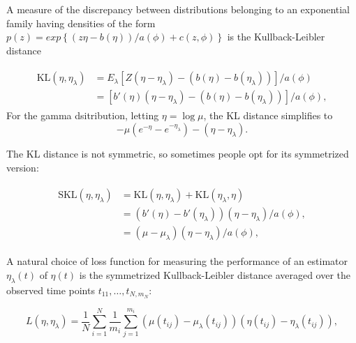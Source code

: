 \bigskip

A measure of the discrepancy between distributions belonging to an exponential family having densities of the form $p\left(z\right) = exp\left\{\left(z \eta - b\left(\eta\right)\right)/a\left(\phi\right) + c\left(z,\phi\right) \right\}$ is the Kullback-Leibler distance

\begin{align}
\begin{split} \label{eq:kl-distance-definition}
\mbox{KL}\left(\eta, \eta_\lambda\right) &= E_\lambda\left[Z \left(\eta - \eta_\lambda \right) - \left(b\left(\eta\right)- b\left(\eta_\lambda\right) \right)\right]/a\left(\phi\right)\\
&=\left[ b'\left(\eta\right) \left(\eta - \eta_\lambda \right) - \left(b\left(\eta\right)- b\left(\eta_\lambda\right) \right)\right]/a\left(\phi\right),
\end{split}
\end{align}
\noindent
For the gamma dsitribution, letting $\eta = \log \mu$, the KL distance simplifies to
\[
-\mu\left( e^{-\eta} - e^{-{\eta_\lambda}}\right) - \left(\eta-{\eta_\lambda}\right).
\]

\noindent
The KL distance is not symmetric, so sometimes people opt for its symmetrized version:

\begin{align}
\begin{split} \label{eq:skl-distance-definition}
\mbox{SKL}\left(\eta, \eta_\lambda\right) &= \mbox{KL}\left(\eta, \eta_\lambda\right) + \mbox{KL}\left(\eta_\lambda, \eta \right)\\
&= \left(b'\left(\eta\right) - b'\left(\eta_\lambda\right) \right)\left( \eta - \eta_\lambda\right)/a\left(\phi\right), \\
&= \left(\mu - \mu_\lambda \right)\left( \eta - \eta_\lambda\right)/a\left(\phi\right),
\end{split}
\end{align}

\noindent
A natural choice of loss function for measuring the performance of an estimator $\eta_\lambda\left(t\right)$ of $\eta \left(t\right)$ is the symmetrized Kullback-Leibler distance averaged over the observed time points $t_{11}, \dots ,  t_{N,m_N}$:

\begin{equation}\label{eq:SKL-loss-function}
L\left( \eta,\eta_\lambda \right) = \frac{1}{N}\sum_{i=1}^N \frac{1}{m_i}\sum_{j=1}^{m_i}  \left(\mu\left(t_{ij}\right) - \mu_\lambda \left(t_{ij}\right)\right)\left( \eta\left(t_{ij}\right) - \eta_\lambda\left(t_{ij}\right)\right),
\end{equation}

